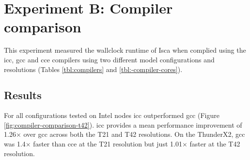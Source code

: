 \documentclass[a4paper,11pt]{report}
\begin{document}
%
%
%
%



\section{Experiment B: Compiler comparison}
This experiment measured the wallclock runtime of Isca when complied using the \gls{icc}, \gls{gcc} and \gls{cce} compilers using two different model configurations and resolutions (Tables \ref{tbl:compilers} and \ref{tbl:-compiler-cores}). 

\subsection{Results}
For all configurations tested on Intel nodes \gls{icc} outperformed \gls{gcc} (Figure \ref{fig:compiler-comparison-t42}). \gls{icc} provides a mean performance improvement of 1.26$\times$ over \gls{gcc} across both the T21 and T42 resolutions. On the ThunderX2, \gls{gcc} was 1.4$\times$ faster than \gls{cce} at the T21 resolution but just 1.01$\times$ faster at the T42 resolution.
\end{document}
